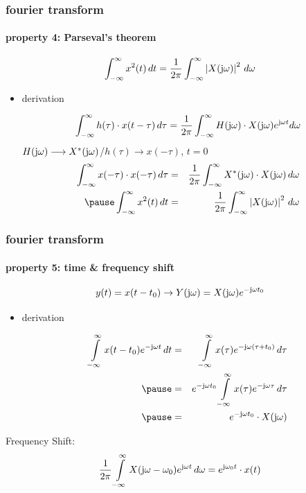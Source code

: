 	\begin{frame}\frametitle{fourier transform}\framesubtitle{property 4: Parseval's theorem}
		\begin{equation}
			\int_{-\infty}^{\infty}{x^2(t)\, dt} = \frac{1}{2\pi}\int_{-\infty}^{\infty} {\left|X(\mathrm{j}\omega)\right|^2\, d\omega} 
		\end{equation}
		\pause
		\begin{itemize}
			\item[]	derivation
			\begin{footnotesize}
				\begin{equation}
					\int_{-\infty}^{\infty}{h(\tau)\cdot x(t-\tau)\, d\tau} = \frac{1}{2\pi}\int_{-\infty}^{\infty} {H(\mathrm{j}\omega)\cdot X(\mathrm{j}\omega) {e}^{\mathrm{j}\omega t} d\omega}\nonumber
				\end{equation}
				 \centering $H(\mathrm{j}\omega) \longrightarrow X^\ast (\mathrm{j}\omega)$/$h(\tau)\longrightarrow x(-\tau)$, $t = 0$
							\pause
				\begin{eqnarray}
					\int_{-\infty}^{\infty}{x(-\tau)\cdot x(-\tau)\, d\tau} &=& \frac{1}{2\pi}\int_{-\infty}^{\infty} {X^\ast (\jom)\cdot X(\jom) \, d\omega}\nonumber\\
					\pause
					\int_{-\infty}^{\infty}{x^2(t)\, dt} &=& \frac{1}{2\pi}\int_{-\infty}^{\infty} {\left|X(\jom)\right|^2\, d\omega} \nonumber
				\end{eqnarray}
			\end{footnotesize}
		\end{itemize}
	\end{frame}	

	\begin{frame}\frametitle{fourier transform}\framesubtitle{property 5: time \& frequency shift}
		\begin{equation}\label{eq:fft_timeshift}
			y(t) = x(t-t_0)\rightarrow Y(\mathrm{j}\omega) = X(\mathrm{j}\omega){e}^{-\mathrm{j}\omega t_0} 
		\end{equation} 
		\pause
		\begin{itemize}
			\item[]	derivation
			\begin{footnotesize}
				\begin{eqnarray}
					\int\limits_{-\infty}^{\infty} {x(t-t_0) \e^{-\jom t}\, dt} &=& \int\limits_{-\infty}^{\infty} {x(\tau) \e^{-\jom (\tau + t_0)}\, d\tau}\nonumber\\
					\pause
					&=& \e^{-\jom t_0}\int\limits_{-\infty}^{\infty} {x(\tau) \e^{-\jom \tau}\, d\tau}\nonumber\\
					\pause
					&=& \e^{-\jom t_0} \cdot X(\jom) \nonumber
				\end{eqnarray}
			\end{footnotesize}
		\end{itemize}
		\pause
		Frequency Shift:
		\begin{equation}
					\frac{1}{2\pi}\int\limits_{-\infty}^{\infty} X(\mathrm{j}\omega-\omega_0) {e}^{\mathrm{j}\omega t}\, d\omega = {e}^{\mathrm{j}\omega_0 t}\cdot x(t) 		
		\end{equation} 

	\end{frame}	

